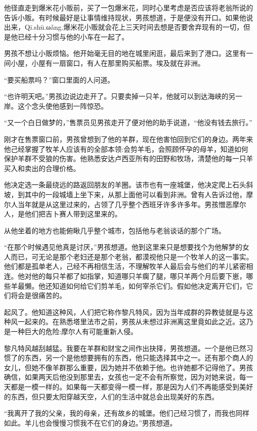 \documentclass[twoside,openany]{book}
\begin{document}
他径直走到爆米花小贩前，买了一包爆米花，同时心里考虑是否应该将老翁所说的告诉小贩。有时候最好是让事情维持现状，男孩想道，于是便没有开口。如果他说出来，Qī.shū.ωǎng.爆米花小贩就会花上三天时间去想是否要舍弃现有的一切，但是他已经十分习惯与他的小车在一起了。

男孩不想让小贩烦恼。他开始毫无目的地在城里闲逛，最后来到了港口。这里有一间小屋，小屋有一扇窗口，有人在那里购买船票。埃及就在非洲。

“要买船票吗？”窗口里面的人问道。

“也许明天吧。”男孩边说边走开了。只要卖掉一只羊，他就可以到达海峡的另一岸。这个念头使他感到一阵惊恐。

“又一个白日做梦的，”售票员见男孩走开了便对他的助手说道，“他没有钱去旅行。”

刚才在售票窗口前，男孩曾想到了他的羊群，现在他害怕回到它们的身边。两年来他己经掌握了牧羊人应该有的全部本领:会剪羊毛，会照顾怀孕的母羊，知道如何保护羊群不受狼的伤害。他熟悉安达卢西亚所有的田野和牧场，清楚他的每一只羊买入和卖出的合理价格。

他决定选一条最绕远的路返回朋友的羊圈。该市也有一座城堡，他决定爬上石头斜坡，到其中的一段城墙上坐下来，从那上面他可以看到非洲。曾有人告诉过他，摩尔人当年就是从这里过来的，占领了几乎整个西班牙许多许多年。男孩憎恶摩尔人，是他们把吉卜赛人带到这里来的。

从他坐着的地方也能俯瞅几乎整个城市，包括他与老翁谈话的那个广场。

“在那个时候遇见他真是讨厌，”男孩想道。他到这里来只是想要找个为他解梦的女人而已，可无论是那个老妇还是那个老翁，都漠视他只是一个牧羊人的这一事实。他们都是孤单老人，己经不再相信生活，不理解牧羊人最后会与他们的羊儿紧密相连。他对他的每只羊都了如指掌，知道哪只羊瘸了腿，哪只羊两个月后要下崽，哪些羊最懒。他还知道如何给它们剪羊毛，如何宰杀它们。假如他决定离开它们，它们将会是很痛苦的。

起风了。他知道这种风，人们把它称作黎凡特风，因为当年成群的异教徒就是与这种风一起来的。在熟悉塔里法市之前，男孩从未想过非洲离这里竟如此之近。这乃是一种巨大的危险:摩尔人有可能重新人侵。

黎凡特风越刮越猛。我要在羊群和财宝之间作出抉择，男孩想道。一个是他已然习惯了的东西，另一个是他想要拥有的东西，他只能选择其中之一。还有那个商人的女儿，但她不像羊群那么重要，因为她并不依赖于他。也许她都不记得他了。男孩确信，如果两天后他没到那里去，女孩也一定不会有所察觉，因为对她来说，每一天都是一模一样的。如果每一天都变得一模一样，那是因为人们不再能感受到美好的东西，但只要太阳穿越天空，人们的生活中就总会出现美好的东西。

“我离开了我的父亲，我的母亲，还有故乡的城堡。他们己经习惯了，而我也同样如此。羊儿也会慢慢习惯我不在它们的身边。”男孩想道。
\end{document}
